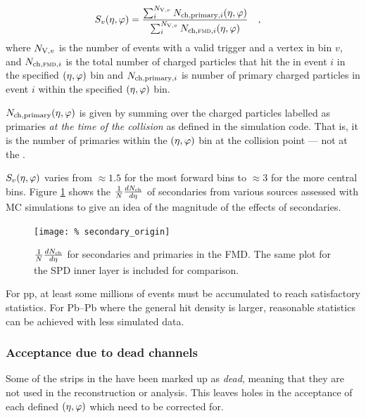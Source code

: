 \documentclass[11pt]{article}
\begin{document}
\begin{align}
  \label{eq:secondary}
  \SecMap{} &=
  \frac{\sum_i^{\NV[,v]}\mult[,\text{primary},i]\etaphi}{
    \sum_i^{\NV[,v]}\mult[,\text{\FMD{}},i]\etaphi}\quad,
\end{align}
where $\NV[,v]$ is the number of events with a valid trigger and a
vertex in bin $v$, and $\mult[,\FMD{},i]$ is the total number of
charged particles that hit the \FMD{} in event $i$ in the specified
$\etaphi$ bin and $\mult[,\text{primary},i]$ is number of
primary charged particles in event $i$ within the specified
$\etaphi$ bin.

$\mult[,\text{primary}]\etaphi$ is given by summing over the
charged particles labelled as primaries \emph{at the time of the
  collision} as defined in the simulation code.  That is, it is the
number of primaries within the $\etaphi$ bin at the collision
point --- not at the \FMD{}.

$\SecMap$ varies from $\approx 1.5$ for the most forward bins to
$\approx 3$ for the more central bins. Figure \ref{secondaries} shows
the $\dndeta$ of secondaries from various sources assessed with MC
simulations to give an idea of the magnitude of the effects of
secondaries.
\begin{figure}[]
  \centering
  \texttt{[image: \%
    secondary\_origin]}
  \caption{$\dndeta$ for secondaries and primaries in the FMD. The
    same plot for the SPD inner layer is included for comparison.}
  \label{secondaries}
\end{figure} 
 
For pp, at least some millions of events must be
accumulated to reach satisfactory statistics.  For Pb--Pb where the
general hit density is larger, reasonable statistics can be achieved
with less simulated data.   

\subsubsection{Acceptance due to dead channels}

Some of the strips in the \FMD{} have been marked up as \emph{dead},
meaning that they are not used in the reconstruction or analysis.
This leaves holes in the acceptance of each defined $\etaphi$
which need to be corrected for.  
\end{document}

